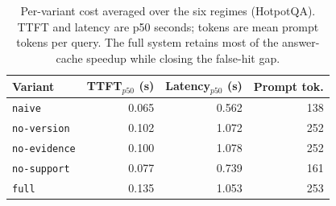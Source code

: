 \begin{table}[t]
\centering\small
\caption{Per-variant cost averaged over the six regimes (HotpotQA). TTFT and latency are p50 seconds; tokens are mean prompt tokens per query. The full system retains most of the answer-cache speedup while closing the false-hit gap.}
\label{tab:latency_variant}
\begin{tabular}{l rrr}
\toprule
Variant & TTFT$_{p50}$ (s) & Latency$_{p50}$ (s) & Prompt tok. \\
\midrule
\texttt{naive} & 0.065 & 0.562 & 138 \\
\texttt{no-version} & 0.102 & 1.072 & 252 \\
\texttt{no-evidence} & 0.100 & 1.078 & 252 \\
\texttt{no-support} & 0.077 & 0.739 & 161 \\
\texttt{full} & 0.135 & 1.053 & 253 \\
\bottomrule
\end{tabular}
\end{table}
